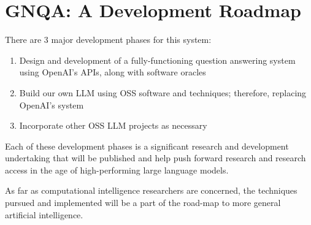 \section{GNQA: A Development Roadmap}
There are 3 major development phases for this system:
\begin{enumerate}
    \item Design and development of a fully-functioning question answering system using OpenAI's APIs, along with software oracles
    \item Build our own LLM using OSS software and techniques; therefore, replacing OpenAI's system
    \item Incorporate other OSS LLM projects as necessary
\end{enumerate}

Each of these development phases is a significant research and development undertaking that will be published and help push forward research and research access in the age of high-performing large language models.

As far as computational intelligence researchers are concerned, the techniques pursued and implemented will be a part of the road-map to more general artificial intelligence.


